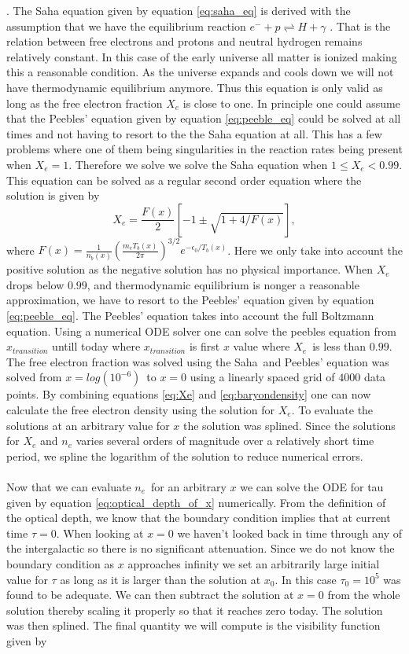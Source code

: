 \documentclass[onecolumn]{aastex62}
\begin{document}
\cite{WintherII:2020}. The Saha equation given by equation \ref{eq:saha_eq} is derived with the assumption that we have the equilibrium reaction $e^- +p\rightleftharpoons H+\gamma$ \cite[p.70]{Dodelson:1282338}. That is the relation between free electrons and protons and neutral hydrogen remains relatively constant. In this case of the early universe all matter is ionized making this a reasonable condition. As the universe expands and cools down we will not have thermodynamic equilibrium anymore. Thus this equation is only valid as long as the free electron fraction $X_e$ is close to one. In principle one could assume that the Peebles' equation given by equation \ref{eq:peeble_eq} could be solved at all times and not having to resort to the the Saha equation at all. This has a few problems where one of them being singularities in the reaction rates being present when $X_e=1$. Therefore we solve we solve the Saha equation when $1\leq X_e<0.99$. This equation can be solved as a regular second order equation where the solution is given by
\begin{equation}
    X_e = \frac{F(x)}{2}\left[-1\pm\sqrt{1+4/F(x)}\right],
\end{equation}
where $F(x)=\frac{1}{n_b(x)} \left(\frac{m_eT_b(x)}{2\pi}\right)^{3/2} e^{-\epsilon_0/T_b(x)}$. Here we only take into account the positive solution as the negative solution has no physical importance. When $X_e$ drops below $0.99$, and thermodynamic equilibrium is nonger a reasonable approximation, we have to resort to the Peebles' equation given by equation \ref{eq:peeble_eq}. The Peebles' equation takes into account the full Boltzmann equation. Using a numerical ODE solver one can solve the peebles equation from $x_{transition}$ untill today where $x_{transition}$ is first $x$ value where $X_e$ is less than $0.99$. The free electron fraction was solved using the Saha and Peebles' equation was solved from $x=log(10^{-6})$ to $x=0$ using a linearly spaced grid of $4000$ data points. By combining equations \ref{eq:Xe} and \ref{eq:baryondensity} one can now calculate the free electron density using the solution for $X_e$. To evaluate the solutions at an arbitrary value for $x$ the solution was splined. Since the solutions for $X_e$ and $n_e$ varies several orders of magnitude over a relatively short time period, we spline the logarithm of the solution to reduce numerical errors.
\\\\\indent
Now that we can evaluate $n_e$ for an arbitrary $x$ we can solve the ODE for tau given by equation \ref{eq:optical_depth_of_x} numerically. From the definition of the optical depth, we know that the boundary condition implies that at current time $\tau=0$. When looking at $x=0$ we haven't looked back in time through any of the intergalactic so there is no significant attenuation. Since we do not know the boundary condition as $x$ approaches infinity we set an arbitrarily large initial value for $\tau$ as long as it is larger than the solution at $x_0$. In this case $\tau_0=10^5$ was found to be adequate. We can then subtract the solution at $x=0$ from the whole solution thereby scaling it properly so that it reaches zero today. The solution was then splined. The final quantity we will compute is the visibility function given by
\end{document}
